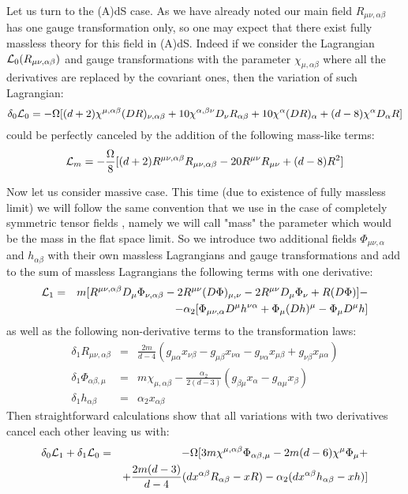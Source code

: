 \documentclass[a4paper,12pt]{article}
\begin{document}
Let us turn to the (A)dS case. As we have already noted our main field
$R_{\mu\nu,\alpha\beta}$ has one gauge transformation only, so one may
expect that there exist fully massless theory for this field in (A)dS. 
Indeed if we consider the Lagrangian ${\cal L}_0 (R_{\mu\nu,\alpha\beta})$ 
and gauge transformations with the parameter $\chi_{\mu,\alpha\beta}$ where
all the derivatives are replaced by the covariant ones, then the
variation of such Lagrangian:
\begin{equation}
\delta_0 {\cal L}_0 = - \Omega [ (d+2) \chi^{\mu,\alpha\beta}
(D R)_{\nu,\alpha\beta} + 10 \chi^{\alpha,\beta\nu} D_\nu R_{\alpha\beta}
+ 10 \chi^\alpha (D R)_\alpha + (d-8) \chi^\alpha D_\alpha R ]
\end{equation}
could be perfectly canceled by the addition of the following mass-like
terms:
\begin{equation}
{\cal L}_m = - \frac{\Omega}{8} [ (d+2) R^{\mu\nu,\alpha\beta}
R_{\mu\nu,\alpha\beta} - 20 R^{\mu\nu} R_{\mu\nu} + (d-8) R^2 ]
\end{equation}

Now let us consider massive case. This time (due to existence of
fully massless limit) we will follow the same convention that we
use in the case of completely symmetric tensor fields \cite{Zin01}, namely
we will call "mass" the parameter which would be the mass in the flat
space limit. So we introduce two additional fields $\Phi_{\mu\nu,\alpha}$
and $h_{\alpha\beta}$ with their own massless Lagrangians and gauge
transformations and add to the sum of massless Lagrangians the following
terms with one derivative:
\begin{eqnarray}
{\cal L}_1 &=& m [ R^{\mu\nu,\alpha\beta} D_\mu \Phi_{\nu,\alpha\beta}
- 2 R^{\mu\nu} (D \Phi)_{\mu,\nu} - 2 R^{\mu\nu} D_\mu \Phi_\nu
+ R (D \Phi) ] - \nonumber \\
 && - \alpha_2 [ \Phi_{\mu\nu,\alpha} D^\mu h^{\nu\alpha} + \Phi_\mu
 (D h)^\mu - \Phi_\mu D^\mu h ]
\end{eqnarray}
as well as the following non-derivative terms to the transformation laws:
\begin{eqnarray}
\delta_1 R_{\mu\nu,\alpha\beta} &=& \frac{2m}{d-4} ( g_{\mu\alpha}
x_{\nu\beta} - g_{\mu\beta} x_{\nu\alpha} - g_{\nu\alpha} x_{\mu\beta}
+ g_{\nu\beta} x_{\mu\alpha} ) \nonumber \\
\delta_1 \Phi_{\alpha\beta,\mu} &=& m \chi_{\mu,\alpha\beta}
- \frac{\alpha_2}{2(d-3)} (g_{\beta\mu} x_\alpha - g_{\alpha\mu}
x_\beta) \\
\delta_1 h_{\alpha\beta} &=& \alpha_2 x_{\alpha\beta} \nonumber
\end{eqnarray}
Then straightforward calculations show that all variations with two
derivatives cancel each other leaving us with:
\begin{eqnarray}
\delta_0 {\cal L}_1 + \delta_1 {\cal L}_0 &=& - \Omega [ 3m
\chi^{\mu,\alpha\beta} \Phi_{\alpha\beta,\mu} - 2m (d-6)
\chi^\mu \Phi_\mu + \nonumber \\
 && + \frac{2m(d-3)}{d-4} (d x^{\alpha\beta} R_{\alpha\beta}
 - x R ) - \alpha_2 (d x^{\alpha\beta} h_{\alpha\beta} - x h) ]
\end{eqnarray}
\end{document}
